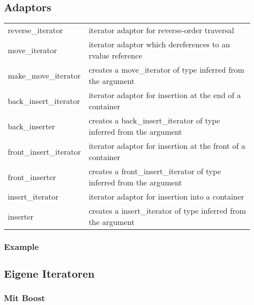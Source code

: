 \subsection{Adaptors}
\begin{tabularx}{\columnwidth}{lX}
	reverse\_iterator      &  iterator adaptor for reverse-order traversal  \\
	move\_iterator         &  iterator adaptor which dereferences to an rvalue reference  \\
	make\_move\_iterator   &  creates a move\_iterator of type inferred from the argument  \\
	back\_insert\_iterator &  iterator adaptor for insertion at the end of a container  \\
	back\_inserter         &  creates a back\_insert\_iterator of type inferred from the argument  \\
	front\_insert\_iterator&  iterator adaptor for insertion at the front of a container  \\
	front\_inserter        &  creates a front\_insert\_iterator of type inferred from the argument  \\
	insert\_iterator       &  iterator adaptor for insertion into a container  \\
	inserter               &  creates a insert\_iterator of type inferred from the argument  \\
\end{tabularx}

\subsubsection{Example}


\subsection{Eigene Iteratoren}
\subsubsection{Mit Boost}

